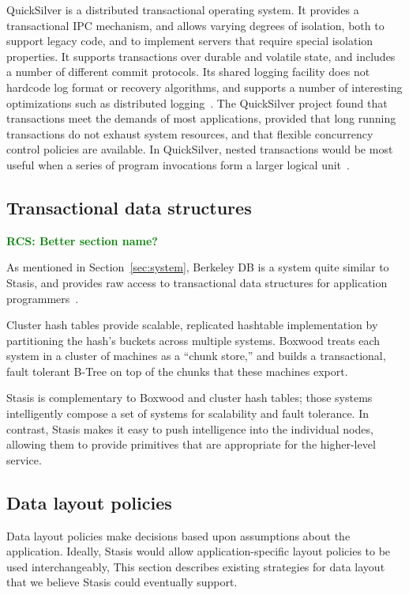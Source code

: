\documentclass[letterpaper,twocolumn,10pt]{article}
\newcommand{\yad}{Stasis\xspace}
\newcommand{\rcs}[1]{\textcolor{green}{\bf RCS: #1}}
\begin{document}
QuickSilver is a distributed transactional operating system.  It
provides a transactional IPC mechanism, and
allows varying degrees of isolation, both to support legacy code, and
to implement servers that require special isolation properties.  It
supports transactions over durable and volatile state, and includes a
number of different commit protocols.  Its shared logging facility does not
hardcode log format or recovery algorithms, and supports a number
of interesting optimizations such as distributed
logging~\cite{recoveryInQuickSilver}.  The QuickSilver project found
that transactions meet the demands of most
applications, provided that long running transactions do not exhaust
system resources, and that flexible concurrency control policies are
available.  In QuickSilver, nested transactions would
be most useful when a series of program invocations
form a larger logical unit~\cite{experienceWithQuickSilver}.

\subsection{Transactional data structures}

\rcs{Better section name?}

As mentioned in Section~\ref{sec:system}, Berkeley DB is a system
quite similar to \yad, and provides raw access to
transactional data structures for application
programmers~\cite{libtp}.  

Cluster hash tables provide scalable, replicated hashtable
implementation by partitioning the hash's buckets across multiple
systems.  Boxwood treats each system in a cluster of machines as a
``chunk store,'' and builds a transactional, fault tolerant B-Tree on
top of the chunks that these machines export.  

\yad is complementary to Boxwood and cluster hash tables; those
systems intelligently compose a set of systems for scalability and
fault tolerance.  In contrast, \yad makes it easy to push intelligence
into the individual nodes, allowing them to provide primitives that
are appropriate for the higher-level service.  

\subsection{Data layout policies}
\label{sec:malloc}
Data layout policies make decisions based upon
assumptions about the application.  Ideally, \yad would allow
application-specific layout policies to be used interchangeably, 
This section describes existing strategies for data
layout that we believe \yad could eventually support.
\end{document}
